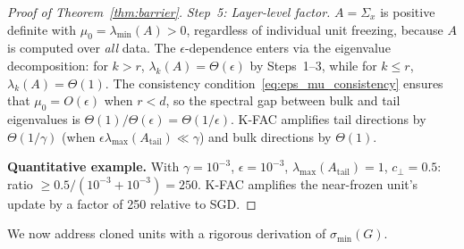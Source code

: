 \documentclass{article}
\theoremstyle{plain}
\theoremstyle{definition}
\theoremstyle{remark}
\begin{document}
\begin{proof}[Proof of Theorem~\ref{thm:barrier}]
\emph{Step~5: Layer-level factor.} $A = \Sigma_x$ is positive definite with $\mu_0 = \lambda_{\min}(A) > 0$, regardless of individual unit freezing, because $A$ is computed over \emph{all} data. The $\epsilon$-dependence enters via the eigenvalue decomposition: for $k > r$, $\lambda_k(A) = \Theta(\epsilon)$ by Steps~1--3, while for $k \leq r$, $\lambda_k(A) = \Theta(1)$. The consistency condition~\eqref{eq:eps_mu_consistency} ensures that $\mu_0 = O(\epsilon)$ when $r < d$, so the spectral gap between bulk and tail eigenvalues is $\Theta(1)/\Theta(\epsilon) = \Theta(1/\epsilon)$. K-FAC amplifies tail directions by $\Theta(1/\gamma)$ (when $\epsilon\lambda_{\max}(A_{\mathrm{tail}}) \ll \gamma$) and bulk directions by $\Theta(1)$.

\textbf{Quantitative example.} With $\gamma = 10^{-3}$, $\epsilon = 10^{-3}$, $\lambda_{\max}(A_{\mathrm{tail}}) = 1$, $c_\perp = 0.5$: ratio $\geq 0.5/(10^{-3} + 10^{-3}) = 250$. K-FAC amplifies the near-frozen unit's update by a factor of 250 relative to SGD.
\end{proof}

We now address cloned units with a rigorous derivation of $\sigma_{\min}(G)$.
\end{document}
